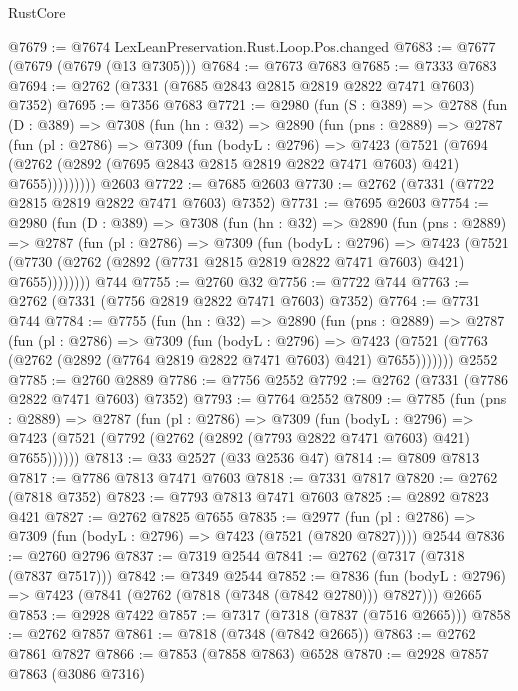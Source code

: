 \begin{lexlean}{RustCore}
\begin{coremodule}
@7679 := @7674 LexLeanPreservation.Rust.Loop.Pos.changed
@7683 := @7677 (@7679 (@7679 (@13 @7305)))
@7684 := @7673 @7683
@7685 := @7333 @7683
@7694 := @2762 (@7331 (@7685 @2843 @2815 @2819 @2822 @7471 @7603) @7352)
@7695 := @7356 @7683
@7721 := @2980
    (fun (S : @389) =>
    @2788
      (fun (D : @389) =>
      @7308
        (fun (hn : @32) =>
        @2890
          (fun (pns : @2889) =>
          @2787
            (fun (pl : @2786) =>
            @7309
              (fun (bodyL : @2796) =>
              @7423
                (@7521
                  (@7694
                    (@2762 (@2892 (@7695 @2843 @2815 @2819 @2822 @7471 @7603) @421) @7655)))))))))
    @2603
@7722 := @7685 @2603
@7730 := @2762 (@7331 (@7722 @2815 @2819 @2822 @7471 @7603) @7352)
@7731 := @7695 @2603
@7754 := @2980
    (fun (D : @389) =>
    @7308
      (fun (hn : @32) =>
      @2890
        (fun (pns : @2889) =>
        @2787
          (fun (pl : @2786) =>
          @7309
            (fun (bodyL : @2796) =>
            @7423
              (@7521 (@7730 (@2762 (@2892 (@7731 @2815 @2819 @2822 @7471 @7603) @421) @7655))))))))
    @744
@7755 := @2760 @32
@7756 := @7722 @744
@7763 := @2762 (@7331 (@7756 @2819 @2822 @7471 @7603) @7352)
@7764 := @7731 @744
@7784 := @7755
    (fun (hn : @32) =>
    @2890
      (fun (pns : @2889) =>
      @2787
        (fun (pl : @2786) =>
        @7309
          (fun (bodyL : @2796) =>
          @7423 (@7521 (@7763 (@2762 (@2892 (@7764 @2819 @2822 @7471 @7603) @421) @7655)))))))
    @2552
@7785 := @2760 @2889
@7786 := @7756 @2552
@7792 := @2762 (@7331 (@7786 @2822 @7471 @7603) @7352)
@7793 := @7764 @2552
@7809 := @7785
    (fun (pns : @2889) =>
    @2787
      (fun (pl : @2786) =>
      @7309
        (fun (bodyL : @2796) =>
        @7423 (@7521 (@7792 (@2762 (@2892 (@7793 @2822 @7471 @7603) @421) @7655))))))
@7813 := @33 @2527 (@33 @2536 @47)
@7814 := @7809 @7813
@7817 := @7786 @7813 @7471 @7603
@7818 := @7331 @7817
@7820 := @2762 (@7818 @7352)
@7823 := @7793 @7813 @7471 @7603
@7825 := @2892 @7823 @421
@7827 := @2762 @7825 @7655
@7835 := @2977
    (fun (pl : @2786) => @7309 (fun (bodyL : @2796) => @7423 (@7521 (@7820 @7827))))
    @2544
@7836 := @2760 @2796
@7837 := @7319 @2544
@7841 := @2762 (@7317 (@7318 (@7837 @7517)))
@7842 := @7349 @2544
@7852 := @7836
    (fun (bodyL : @2796) => @7423 (@7841 (@2762 (@7818 (@7348 (@7842 @2780))) @7827)))
    @2665
@7853 := @2928 @7422
@7857 := @7317 (@7318 (@7837 (@7516 @2665)))
@7858 := @2762 @7857
@7861 := @7818 (@7348 (@7842 @2665))
@7863 := @2762 @7861 @7827
@7866 := @7853 (@7858 @7863) @6528
@7870 := @2928 @7857 @7863 (@3086 @7316)

\end{coremodule}
\end{lexlean}
